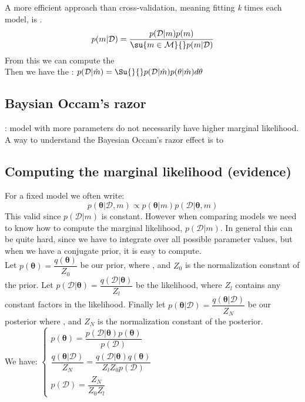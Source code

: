 A more efficient approach than cross-validation, meaning fitting \emph{k} times each
model, is .
$$
p(m|\mathcal{D}) = \dfrac{p(\mathcal{D}|m)p(m)}{\su{{m\in\mathcal{M}}}{}p(m|\mathcal{D})}
$$
From this we can compute the \\
Then we have the : $p(\mathcal{D}|\hat{m}) = \Su{}{}p(
\mathcal{D}|\hat{m})p(\theta|\hat{m})d\theta$

\subsection{Baysian Occam's razor}
: model with more parameters do not necessarily have higher 
marginal likelihood.\\
A way to understand the Bayesian Occam's razor effect is to 

\subsection{Computing the marginal likelihood (evidence)}
For a fixed model we often write:
$$p(\bm{\theta}|\mathcal{D},m) \propto p(\bm{\theta}|m)p(\mathcal{D}|\bm{\theta},m)$$
This valid since $p(\mathcal{D}|m)$ is constant. However when comparing models we need
to know how to compute the marginal likelihood, $p(\mathcal{D}|m)$. In general this can
be quite hard, since we have to integrate over all possible parameter values, but when
we have a conjugate prior, it is easy to compute.\\
Let $p(\bm{\theta})=\dfrac{q(\bm{\theta})}{Z_{0}}$ be our prior, where , and $Z_{0}$ is the normalization constant of the prior.
Let $p(\mathcal{D}|\bm{\theta})=\dfrac{q(\mathcal{D}|\bm{\theta})}{Z_{l}}$ be the 
likelihood, where $Z_{l}$ contains any constant factors in the likelihood. Finally let
$p(\bm{\theta}|\mathcal{D})=\dfrac{q(\bm{\theta}|\mathcal{D})}{Z_{N}}$ be our posterior
where , and $Z_{N}$ is the normalization constant of the posterior.\\
We have:
$
\begin{cases}
	p(\bm{\theta})= \dfrac{p(\mathcal{D}|\bm{\theta})p(\bm{\theta})}{p(\mathcal{D})}\\
	\dfrac{q(\bm{\theta}|\mathcal{D})}{Z_{N}} = \dfrac{q(\mathcal{D}|\bm{\theta})
	q(\bm{\theta})}{Z_{l}Z_{0}p(\mathcal{D})}\\
	p(\mathcal{D}) = \dfrac{Z_{N}}{Z_{0}Z_{l}}
\end{cases}
$


